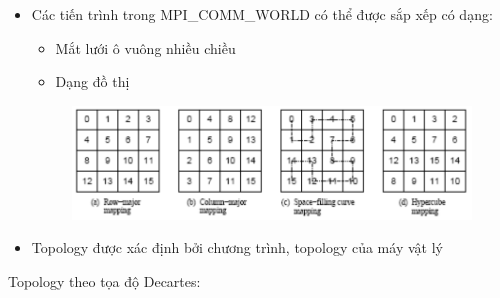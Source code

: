 \documentclass[14pt, a4paper]{article}
\numberwithin{equation}{section}
\numberwithin{figure}{section}
\numberwithin{dl}{section}
\numberwithin{md}{section}
\numberwithin{bd}{section}
\numberwithin{dn}{section}
\numberwithin{hq}{section}
\begin{document}
\begin{itemize}
    \item Các tiến trình trong MPI\_COMM\_WORLD có thể được sắp xếp có dạng:
    \begin{itemize}
        \item Mắt lưới ô vuông nhiều chiều
        \item Dạng đồ thị
    \end{itemize}
    \begin{figure}[H]
        \centering
        \includegraphics[width=0.7\linewidth]{figures/MPI/Topology.png}
    \end{figure}
    \item Topology được xác định bởi chương trình, topology của máy vật lý
\end{itemize}

Topology theo tọa độ Decartes:
\end{document}
